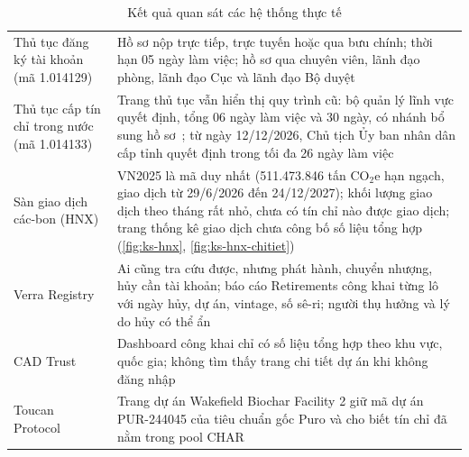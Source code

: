 \begin{table}[!htbp]
    \centering
    \caption{Kết quả quan sát các hệ thống thực tế}
    \label{tab:ks-quansat}
    \label{tab:ks-quansat-qt}
    \small
    \begin{tabularx}{\textwidth}{|L{3.0cm}|Y|}
        \hline
         &  \\
        \hline
        Thủ tục đăng ký tài khoản (mã 1.014129) & Hồ sơ nộp trực tiếp, trực tuyến hoặc qua bưu chính; thời hạn 05 ngày làm việc; hồ sơ qua chuyên viên, lãnh đạo phòng, lãnh đạo Cục và lãnh đạo Bộ duyệt~\cite{mae2026tthc1014129,mae2025qd2935} \\
        \hline
        Thủ tục cấp tín chỉ trong nước (mã 1.014133) & Trang thủ tục vẫn hiển thị quy trình cũ: bộ quản lý lĩnh vực quyết định, tổng 06 ngày làm việc và 30 ngày, có nhánh bổ sung hồ sơ~\cite{mae2026tthc1014133}; từ ngày 12/12/2026, Chủ tịch Ủy ban nhân dân cấp tỉnh quyết định trong tối đa 26 ngày làm việc~\cite{vietnam2026nghidinh396} \\
        \hline
        Sàn giao dịch các-bon (HNX) & VN2025 là mã duy nhất (511.473.846 tấn CO$_2$e hạn ngạch, giao dịch từ 29/6/2026 đến 24/12/2027); khối lượng giao dịch theo tháng rất nhỏ, chưa có tín chỉ nào được giao dịch; trang thống kê giao dịch chưa công bố số liệu tổng hợp (\autoref{fig:ks-hnx}, \autoref{fig:ks-hnx-chitiet}) \\
        \hline
        Verra Registry & Ai cũng tra cứu được, nhưng phát hành, chuyển nhượng, hủy cần tài khoản; báo cáo Retirements công khai từng lô với ngày hủy, dự án, vintage, số sê-ri; người thụ hưởng và lý do hủy có thể ẩn~\cite{verraregistry,verra2020registryv2} \\
        \hline
        CAD Trust & Dashboard công khai chỉ có số liệu tổng hợp theo khu vực, quốc gia; không tìm thấy trang chi tiết dự án khi không đăng nhập~\cite{cadtrust2026dashboard} \\
        \hline
        Toucan Protocol & Trang dự án Wakefield Biochar Facility 2 giữ mã dự án PUR-244045 của tiêu chuẩn gốc Puro và cho biết tín chỉ đã nằm trong pool CHAR~\cite{toucan2026wakefield} \\
        \hline
    \end{tabularx}
\end{table}

